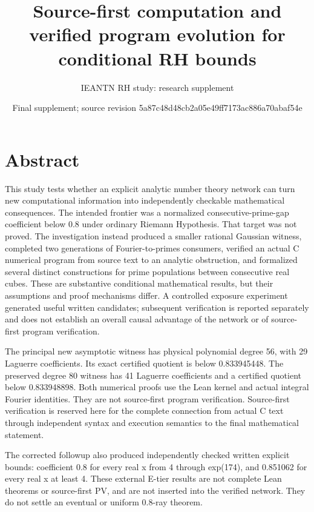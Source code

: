 \documentclass[11pt]{article}
\title{Source-first computation and verified program evolution for conditional RH bounds}
\author{IEANTN RH study: research supplement}
\date{Final supplement; source revision 5a87c48d48cb2a05e49ff7173ac886a70abaf54e}
\begin{document}
\maketitle

\section{Abstract}

This study tests whether an explicit analytic number theory network can turn new computational information into independently checkable mathematical consequences. The intended frontier was a normalized consecutive-prime-gap coefficient below 0.8 under ordinary Riemann Hypothesis. That target was not proved. The investigation instead produced a smaller rational Gaussian witness, completed two generations of Fourier-to-primes consumers, verified an actual C numerical program from source text to an analytic obstruction, and formalized several distinct constructions for prime populations between consecutive real cubes. These are substantive conditional mathematical results, but their assumptions and proof mechanisms differ. A controlled exposure experiment generated useful written candidates; subsequent verification is reported separately and does not establish an overall causal advantage of the network or of source-first program verification.


The principal new asymptotic witness has physical polynomial degree 56, with 29 Laguerre coefficients. Its exact certified quotient is below 0.833945448. The preserved degree 80 witness has 41 Laguerre coefficients and a certified quotient below 0.833948898. Both numerical proofs use the Lean kernel and actual integral Fourier identities. They are not source-first program verification. Source-first verification is reserved here for the complete connection from actual C text through independent syntax and execution semantics to the final mathematical statement.


The corrected followup also produced independently checked written explicit bounds: coefficient 0.8 for every real x from 4 through exp(174), and 0.851062 for every real x at least 4. These external E-tier results are not complete Lean theorems or source-first PV, and are not inserted into the verified network. They do not settle an eventual or uniform 0.8-ray theorem.


\begin{center}


\ifdim\wd\eqbox>\linewidth\resizebox{\linewidth}{!}{\usebox{\eqbox}}\else\usebox{\eqbox}\fi

\end{center}
\end{document}
